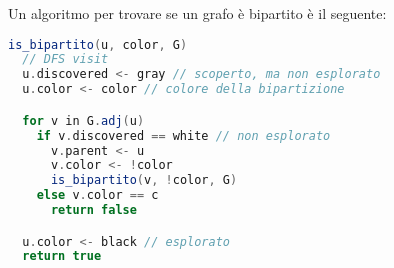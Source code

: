 \documentclass[a4paper]{article}
\begin{document}
\vspace{1em}
\noindent
Un algoritmo per trovare se un grafo è bipartito è il seguente:
\begin{lstlisting}[language=Scala]
is_bipartito(u, color, G)
  // DFS visit
  u.discovered <- gray // scoperto, ma non esplorato
  u.color <- color // colore della bipartizione

  for v in G.adj(u)
    if v.discovered == white // non esplorato
      v.parent <- u
      v.color <- !color
      is_bipartito(v, !color, G)
    else v.color == c
      return false

  u.color <- black // esplorato
  return true
\end{lstlisting}
\end{document}
